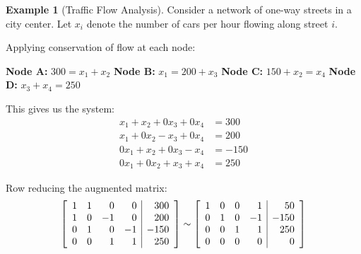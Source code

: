 \documentclass[12pt]{article}
\numberwithin{equation}{section}
\newenvironment{amatrix}[1]{%
  \left[\begin{array}{#1}}
  {\end{array}\right]}
\theoremstyle{plain}
\theoremstyle{definition}
\newtheorem{example}[theorem]{Example}
\theoremstyle{remark}
\begin{document}
\begin{example}[Traffic Flow Analysis]
Consider a network of one-way streets in a city center. Let $x_i$ denote the number of cars per hour flowing along street $i$.

\begin{center}
\end{center}

Applying conservation of flow at each node:

\textbf{Node A:} $300 = x_1 + x_2$
\textbf{Node B:} $x_1 = 200 + x_3$  
\textbf{Node C:} $150 + x_2 = x_4$
\textbf{Node D:} $x_3 + x_4 = 250$

This gives us the system:
\begin{align}
x_1 + x_2 + 0x_3 + 0x_4 &= 300\\
x_1 + 0x_2 - x_3 + 0x_4 &= 200\\
0x_1 + x_2 + 0x_3 - x_4 &= -150\\
0x_1 + 0x_2 + x_3 + x_4 &= 250
\end{align}

Row reducing the augmented matrix:
$$\begin{amatrix}{rrrr|r}
1 & 1 & 0 & 0 & 300\\
1 & 0 & -1 & 0 & 200\\
0 & 1 & 0 & -1 & -150\\
0 & 0 & 1 & 1 & 250
\end{amatrix} \sim \begin{amatrix}{rrrr|r}
1 & 0 & 0 & 1 & 50\\
0 & 1 & 0 & -1 & -150\\
0 & 0 & 1 & 1 & 250\\
0 & 0 & 0 & 0 & 0
\end{amatrix}$$


\end{example}
\end{document}
